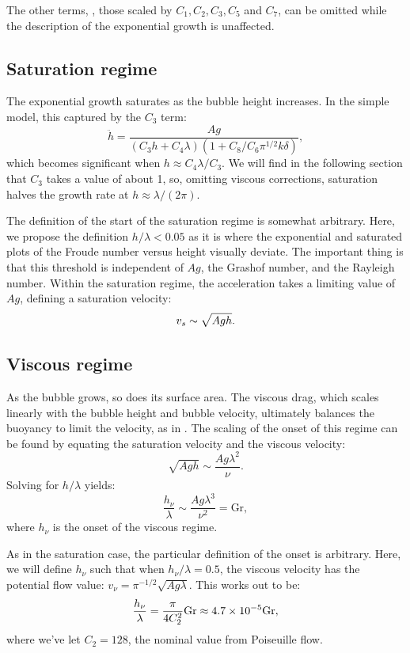 The other terms, \ie, those scaled by $C_1, C_2, C_3, C_5$ and $C_7$, can be omitted while the description of the exponential growth is unaffected.

\subsection{Saturation regime}
The exponential growth saturates as the bubble height increases.
In the simple model, this captured by the $C_3$ term:
\begin{equation}
\ddot{h} = \frac{A g}{(C_3 h + C_4 \lambda) (1 + C_8 / C_6 \pi^{1/2} k \delta)},
\end{equation}
which becomes significant when $h \approx C_4 \lambda / C_3$.
We will find in the following section that $C_3$ takes a value of about 1, so, omitting viscous corrections, saturation halves the growth rate at $h \approx \lambda / (2\pi)$.

The definition of the start of the saturation regime is somewhat arbitrary.
Here, we propose the definition $h/\lambda < 0.05$ as it is where the exponential and saturated plots of the Froude number versus height visually deviate.
The important thing is that this threshold is independent of $Ag$, the Grashof number, and the Rayleigh number.
Within the saturation regime, the acceleration takes a limiting value of $Ag$, defining a saturation velocity:
\begin{equation} \elabel{vel_sat}
v_s \sim \sqrt{A g h}.
\end{equation}

\subsection{Viscous regime}
As the bubble grows, so does its surface area.
The viscous drag, which scales linearly with the bubble height and bubble velocity, ultimately balances the buoyancy to limit the velocity, as in .
The scaling of the onset of this regime can be found by equating the saturation velocity and the viscous velocity:
\begin{equation}
\sqrt{A g h} \sim \frac{A g \lambda^2}{\nu}.
\end{equation}
Solving for $h/\lambda$ yields:
\begin{equation}
\frac{h_\nu}{\lambda} \sim \frac{A g \lambda^3}{\nu^2} = \text{Gr},
\end{equation}
where $h_\nu$ is the onset of the viscous regime.

As in the saturation case, the particular definition of the onset is arbitrary.
Here, we will define $h_\nu$ such that when $h_\nu/\lambda = 0.5$, the viscous velocity has the potential flow value: $v_\nu = \pi^{-1/2} \sqrt{A g \lambda}$.
This works out to be:
\begin{equation} \elabel{visc_height}
\frac{h_\nu}{\lambda} = \frac{\pi}{4 C_2^2} \text{Gr} \approx 4.7 \times 10^{-5} \text{Gr},
\end{equation}
where we've let $C_2 = 128$, the nominal value from Poiseuille flow.

